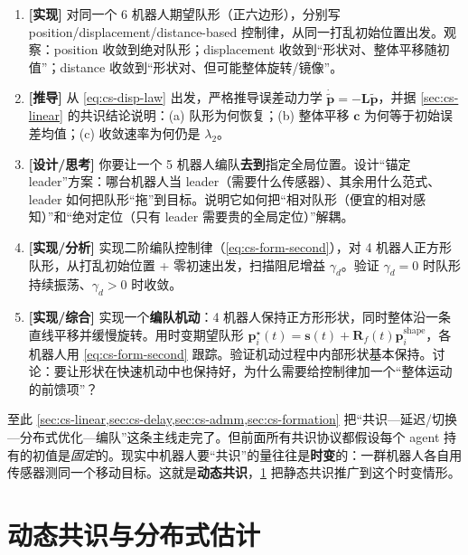 \begin{practice}
\begin{enumerate}
  \item \textbf{[实现]} 对同一个 6 机器人期望队形（正六边形），分别写 position/displacement/distance-based 控制律，从同一打乱初始位置出发。观察：position 收敛到绝对队形；displacement 收敛到“形状对、整体平移随初值”；distance 收敛到“形状对、但可能整体旋转/镜像”。
  \item \textbf{[推导]} 从 \cref{eq:cs-disp-law} 出发，严格推导误差动力学 $\dot{\tilde{\mathbf{p}}}=-\mathbf{L}\tilde{\mathbf{p}}$，并据 \cref{sec:cs-linear} 的共识结论说明：(a) 队形为何恢复；(b) 整体平移 $\mathbf{c}$ 为何等于初始误差均值；(c) 收敛速率为何仍是 $\lambda_2$。
  \item \textbf{[设计/思考]} 你要让一个 5 机器人编队\textbf{去到}指定全局位置。设计“锚定 leader”方案：哪台机器人当 leader（需要什么传感器）、其余用什么范式、leader 如何把队形“拖”到目标。说明它如何把“相对队形（便宜的相对感知）”和“绝对定位（只有 leader 需要贵的全局定位）”解耦。
  \item \textbf{[实现/分析]} 实现二阶编队控制律（\cref{eq:cs-form-second}），对 4 机器人正方形队形，从打乱初始位置 + 零初速出发，扫描阻尼增益 $\gamma_d$。验证 $\gamma_d=0$ 时队形持续振荡、$\gamma_d>0$ 时收敛。
  \item \textbf{[实现/综合]} 实现一个\textbf{编队机动}：4 机器人保持正方形形状，同时整体沿一条直线平移并缓慢旋转。用时变期望队形 $\mathbf{p}_i^\star(t)=\mathbf{s}(t)+\mathbf{R}_f(t)\mathbf{p}_i^{\text{shape}}$，各机器人用 \cref{eq:cs-form-second} 跟踪。验证机动过程中内部形状基本保持。讨论：要让形状在快速机动中也保持好，为什么需要给控制律加一个“整体运动的前馈项”？
\end{enumerate}
\end{practice}

\noindent 至此 \cref{sec:cs-linear,sec:cs-delay,sec:cs-admm,sec:cs-formation} 把“共识—延迟/切换—分布式优化—编队”这条主线走完了。但前面所有共识协议都假设每个 agent 持有的初值是\emph{固定}的。现实中机器人要“共识”的量往往是\textbf{时变}的：一群机器人各自用传感器测同一个移动目标。这就是\textbf{动态共识}，\cref{sec:cs-dynamic} 把静态共识推广到这个时变情形。

\section{动态共识与分布式估计}
\label{sec:cs-dynamic}

